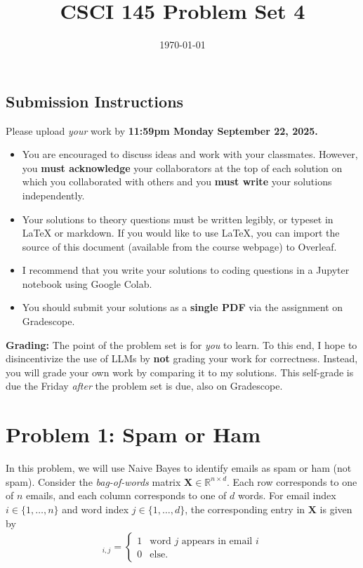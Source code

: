 \documentclass{article}
\title{CSCI 145 Problem Set 4}
\author{} %
\date{\today}
\begin{document}
\maketitle

\subsection*{Submission Instructions}

Please upload \textit{your} work by
\textbf{11:59pm Monday September 22, 2025.}
\begin{itemize}
\item You are encouraged to discuss ideas
and work with your classmates. However, you
\textbf{must acknowledge} your collaborators
at the top of each solution on which
you collaborated with others 
and you \textbf{must write} your solutions
independently.
\item Your solutions to theory questions must
be written legibly, or typeset in LaTeX or markdown.
If you would like to use LaTeX, you can import the source of this document (available from the course webpage) to Overleaf.
\item I recommend that you write your solutions to coding questions in a Jupyter notebook using Google Colab.
\item You should submit your solutions as a \textbf{single PDF} via the assignment on Gradescope.
\end{itemize}

\noindent
\textbf{Grading:} The point of the problem set is for \textit{you} to learn. To this end, I hope to disincentivize the use of LLMs by \textbf{not} grading your work for correctness. Instead, you will grade your own work by comparing it to my solutions. This self-grade is due the Friday \textit{after} the problem set is due, also on Gradescope.

\newpage
\section*{Problem 1: Spam or Ham}

In this problem, we will use Naive Bayes to identify emails as spam or ham (not spam).
Consider the \textit{bag-of-words} matrix $\mathbf{X} \in \mathbb{R}^{n \times d}$.
Each row corresponds to one of $n$ emails, and each column corresponds to one of $d$ words.
For email index $i \in \{1, \ldots, n\}$ and word index $j \in \{1, \ldots, d\}$, the corresponding entry in $\mathbf{X}$ is given by
\begin{align}
    [\mathbf{X}]_{i,j} = \begin{cases}
        1 & \text{word $j$ appears in email $i$} \\
        0 & \text{else}.
    \end{cases}
\end{align}
\end{document}
